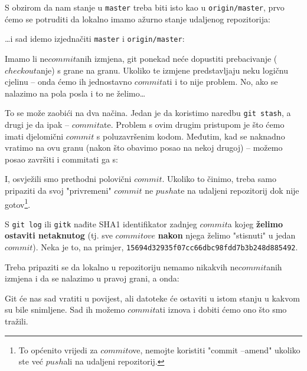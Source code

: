 S obzirom da nam stanje u \verb+master+ treba biti isto kao u \verb+origin/master+, prvo ćemo se potruditi da lokalno imamo ažurno stanje udaljenog repozitorija:


\dots{}i sad idemo izjednačiti \verb+master+ i \verb+origin/master+:



Imamo li ne$commit$anih izmjena, git ponekad neće dopustiti prebacivanje ($checkout$anje) s grane na granu.
Ukoliko te izmjene predstavljaju neku logičnu cjelinu -- onda ćemo ih jednostavno $commit$ati i to nije problem.
No, ako se nalazimo na pola posla i to ne želimo\dots

To se može zaobići na dva načina.
Jedan je da koristimo naredbu \verb+git stash+, a drugi je da ipak -- $commit$ate.
Problem s ovim drugim pristupom je što ćemo imati djelomični $commit$ s poluzavršenim kodom.  
Međutim, kad se naknadno vratimo na ovu granu (nakon što obavimo posao na nekoj drugoj) -- možemo posao završiti i commitati ga s:


I, osvježili smo prethodni polovični $commit$.
Ukoliko to činimo, treba samo pripaziti da svoj "privremeni" $commit$ ne $push$ate na udaljeni repozitorij dok nije gotov\footnote{To općenito vrijedi za $commit$ove, nemojte koristiti "commit --amend" ukoliko ste već $push$ali na udaljeni repozitorij.}.


S \verb+git log+ ili \verb+gitk+ nađite SHA1 identifikator zadnjeg $commit$a kojeg \textbf{želimo ostaviti netaknutog} (tj. sve $commitove$ \textbf{nakon} njega želimo "stisnuti" u jedan $commit$).
Neka je to, na primjer, \verb+15694d32935f07cc66dbc98fdd7b3b248d885492+.

Treba pripaziti se da lokalno u repozitoriju nemamo nikakvih ne$commit$anih izmjena i da se nalazimo u pravoj grani, a onda:


Git će nas sad vratiti u povijest, ali datoteke će ostaviti u istom stanju u kakvom su bile snimljene.
Sad ih možemo $commit$ati iznova i dobiti ćemo ono što smo tražili.

